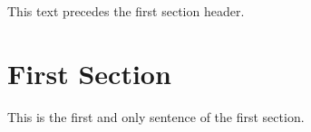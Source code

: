 
%
%
\renewcommand{\Large}{\fontsiz{17}{20pt}\selectfont}



This text precedes the first section header.

%
\section{First Section}

This is the first and only sentence of the
first section.


